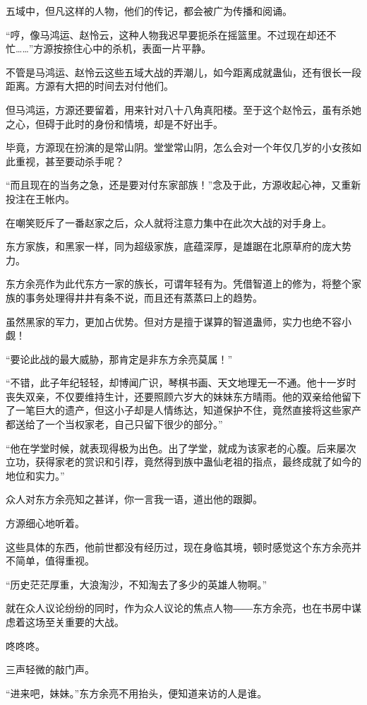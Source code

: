 \begin{this_body}
五域中，但凡这样的人物，他们的传记，都会被广为传播和阅诵。

“哼，像马鸿运、赵怜云，这种人物我迟早要扼杀在摇篮里。不过现在却还不忙……”方源按捺住心中的杀机，表面一片平静。

不管是马鸿运、赵怜云这些五域大战的弄潮儿，如今距离成就蛊仙，还有很长一段距离。方源有大把的时间去对付他们。

但马鸿运，方源还要留着，用来针对八十八角真阳楼。至于这个赵怜云，虽有杀她之心，但碍于此时的身份和情境，却是不好出手。

毕竟，方源现在扮演的是常山阴。堂堂常山阴，怎么会对一个年仅几岁的小女孩如此重视，甚至要动杀手呢？

“而且现在的当务之急，还是要对付东家部族！”念及于此，方源收起心神，又重新投注在王帐内。

在嘲笑贬斥了一番赵家之后，众人就将注意力集中在此次大战的对手身上。

东方家族，和黑家一样，同为超级家族，底蕴深厚，是雄踞在北原草府的庞大势力。

东方余亮作为此代东方一家的族长，可谓年轻有为。凭借智道上的修为，将整个家族的事务处理得井井有条不说，而且还有蒸蒸曰上的趋势。

虽然黑家的军力，更加占优势。但对方是擅于谋算的智道蛊师，实力也绝不容小觑！

“要论此战的最大威胁，那肯定是非东方余亮莫属！”

“不错，此子年纪轻轻，却博闻广识，琴棋书画、天文地理无一不通。他十一岁时丧失双亲，不仅要维持生计，还要照顾六岁大的妹妹东方晴雨。他的双亲给他留下了一笔巨大的遗产，但这小子却是人情练达，知道保护不住，竟然直接将这些家产都送给了一个当权家老，自己只留下很少的部分。”

“他在学堂时候，就表现得极为出色。出了学堂，就成为该家老的心腹。后来屡次立功，获得家老的赏识和引荐，竟然得到族中蛊仙老祖的指点，最终成就了如今的地位和实力。”

众人对东方余亮知之甚详，你一言我一语，道出他的跟脚。

方源细心地听着。

这些具体的东西，他前世都没有经历过，现在身临其境，顿时感觉这个东方余亮并不简单，值得重视。

“历史茫茫厚重，大浪淘沙，不知淘去了多少的英雄人物啊。”

就在众人议论纷纷的同时，作为众人议论的焦点人物――东方余亮，也在书房中谋虑着这场至关重要的大战。

咚咚咚。

三声轻微的敲门声。

“进来吧，妹妹。”东方余亮不用抬头，便知道来访的人是谁。


\end{this_body}
